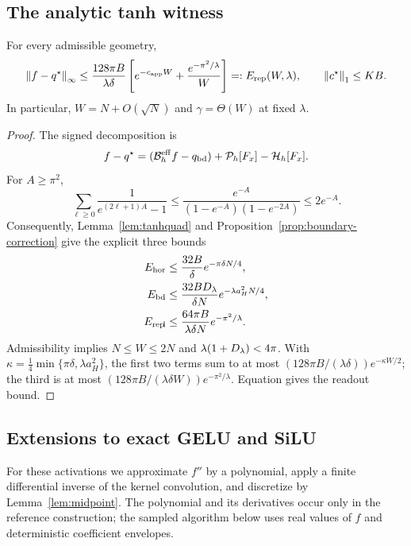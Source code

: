 \subsection{The analytic tanh witness}
\label{sec:witness}
\begin{theorem}
\label{thm:witness}
For every admissible geometry,
\begin{equation}
 \left\lVert f-q^\star\right\rVert_\infty\le
 \frac{128\pi B}{\lambda\delta}
 \left[e^{-c_{\mathrm{app}} W}+\frac{e^{-\pi^2/\lambda}}W\right]
 =:E_{\mathrm{rep}}(W,\lambda),\qquad \left\lVert c^\star\right\rVert_1\le KB.
 \label{eq:Erep}
\end{equation}
In particular, $W=N+O(\sqrt N)$ and $\gamma=\Theta(W)$ at fixed $\lambda$.
\end{theorem}
\begin{proof}
The signed decomposition is
\begin{equation}
 f-q^\star=(\mathcal B_h^{\rm eff}f-q_{\rm bd})
            +\mathcal P_h[F_x]-\mathcal H_h[F_x].
 \label{eq:corrected-decomp}
\end{equation}
For $A\ge\pi^2$,
\[
 \sum_{\ell\ge0}\frac1{e^{(2\ell+1)A}-1}
 \le\frac{e^{-A}}{(1-e^{-A})(1-e^{-2A})}\le2e^{-A}.
\]
Consequently, Lemma~\ref{lem:tanhquad} and
Proposition~\ref{prop:boundary-correction} give the explicit three bounds
\begin{align*}
 E_{\rm hor}&\le\frac{32B}\delta e^{-\pi\delta N/4},\\
 E_{\rm bd}&\le\frac{32BD_\lambda}{\delta N}e^{-\lambda a_H^2N/4},\\
 E_{\rm rep\!l}&\le\frac{64\pi B}{\lambda\delta N}e^{-\pi^2/\lambda}.
\end{align*}
Admissibility implies $N\le W\le2N$ and
$\lambda(1+D_\lambda)<4\pi$. With
$\kappa=\tfrac14\min\{\pi\delta,\lambda a_H^2\}$, the first two terms
sum to at most $(128\pi B/(\lambda\delta))e^{-\kappa W/2}$;
the third is at most $(128\pi B/(\lambda\delta W))e^{-\pi^2/\lambda}$.
Equation  gives the readout bound.
\end{proof}

\subsection{Extensions to exact GELU and SiLU}
\label{app:gelu-silu}
For these activations we approximate $f''$ by a polynomial, apply a finite
differential inverse of the kernel convolution, and discretize by
Lemma~\ref{lem:midpoint}. The polynomial and its derivatives occur only in
the reference construction; the sampled algorithm below uses real values of
$f$ and deterministic coefficient envelopes.

